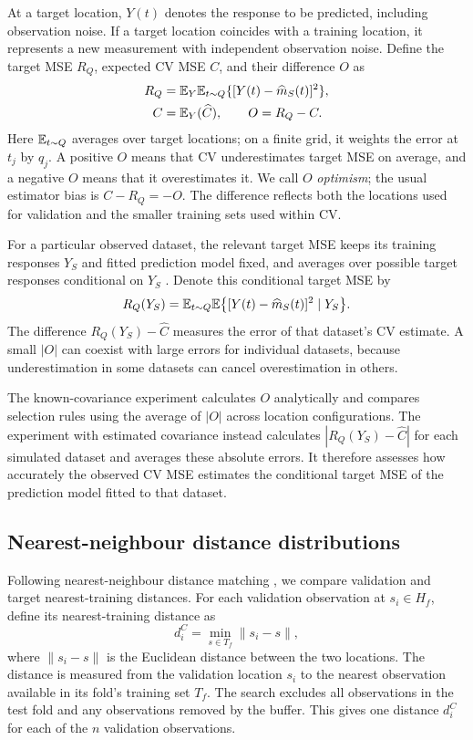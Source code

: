 At a target location, $Y(t)$ denotes the response to be predicted, including observation noise. If a target location coincides with a training location, it represents a new measurement with independent observation noise. Define the target MSE $R_Q$, expected CV MSE $C$, and their difference $O$ as
\begin{align}
 R_Q &= \mathbb{E}_Y\mathbb{E}_{t\sim Q}\{[Y(t)-\widehat m_S(t)]^2\},\\
 C &= \mathbb{E}_Y(\widehat C),\qquad O=R_Q-C.\label{eq:risk}
\end{align}
Here $\mathbb{E}_{t\sim Q}$ averages over target locations; on a finite grid, it weights the error at $t_j$ by $q_j$. A positive $O$ means that CV underestimates target MSE on average, and a negative $O$ means that it overestimates it. We call $O$ \emph{optimism}; the usual estimator bias is $C-R_Q=-O$. The difference reflects both the locations used for validation and the smaller training sets used within CV.

For a particular observed dataset, the relevant target MSE keeps its training responses $Y_S$ and fitted prediction model fixed, and averages over possible target responses conditional on $Y_S$ \citep{bates2024crossvalidation}. Denote this conditional target MSE by
\[
 R_Q(Y_S)=\mathbb{E}_{t\sim Q}\mathbb{E}\bigl\{[Y(t)-\widehat m_S(t)]^2\mid Y_S\bigr\}.
\]
The difference $R_Q(Y_S)-\widehat C$ measures the error of that dataset's CV estimate. A small $|O|$ can coexist with large errors for individual datasets, because underestimation in some datasets can cancel overestimation in others.

The known-covariance experiment calculates $O$ analytically and compares selection rules using the average of $|O|$ across location configurations. The experiment with estimated covariance instead calculates $|R_Q(Y_S)-\widehat C|$ for each simulated dataset and averages these absolute errors. It therefore assesses how accurately the observed CV MSE estimates the conditional target MSE of the prediction model fitted to that dataset.

\subsection{Nearest-neighbour distance distributions}
\label{sec:distances}
Following nearest-neighbour distance matching \citep{mila2022nndm,linnenbrink2024knndm}, we compare validation and target nearest-training distances. For each validation observation at $s_i\in H_f$, define its nearest-training distance as
\[
 d_i^C=\min_{s\in T_f}\|s_i-s\|,
\]
where $\|s_i-s\|$ is the Euclidean distance between the two locations. The distance is measured from the validation location $s_i$ to the nearest observation available in its fold's training set $T_f$. The search excludes all observations in the test fold and any observations removed by the buffer. This gives one distance $d_i^C$ for each of the $n$ validation observations.

